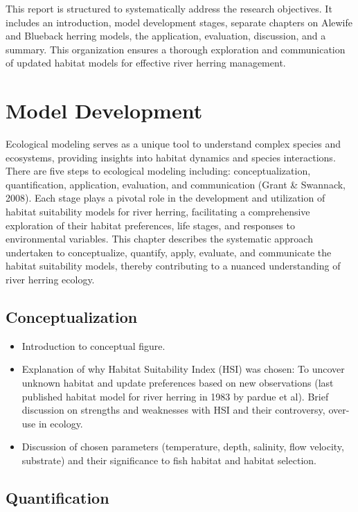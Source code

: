 \documentclass[
]{book}
\begin{document}
This report is structured to systematically address the research objectives. It includes an introduction, model development stages, separate chapters on Alewife and Blueback herring models, the application, evaluation, discussion, and a summary. This organization ensures a thorough exploration and communication of updated habitat models for effective river herring management.

\hypertarget{method}{%
\chapter{Model Development}\label{method}}

Ecological modeling serves as a unique tool to understand complex species and ecosystems, providing insights into habitat dynamics and species interactions. There are five steps to ecological modeling including: conceptualization, quantification, application, evaluation, and communication (Grant \& Swannack, 2008). Each stage plays a pivotal role in the development and utilization of habitat suitability models for river herring, facilitating a comprehensive exploration of their habitat preferences, life stages, and responses to environmental variables. This chapter describes the systematic approach undertaken to conceptualize, quantify, apply, evaluate, and communicate the habitat suitability models, thereby contributing to a nuanced understanding of river herring ecology.

\hypertarget{conceptualization}{%
\section{Conceptualization}\label{conceptualization}}

\begin{itemize}
\item
  Introduction to conceptual figure.
\item
  Explanation of why Habitat Suitability Index (HSI) was chosen: To uncover unknown habitat and update preferences based on new observations (last published habitat model for river herring in 1983 by pardue et al). Brief discussion on strengths and weaknesses with HSI and their controversy, over-use in ecology.
\item
  Discussion of chosen parameters (temperature, depth, salinity, flow velocity, substrate) and their significance to fish habitat and habitat selection.
\end{itemize}

\hypertarget{quantification}{%
\section{Quantification}\label{quantification}}
\end{document}
